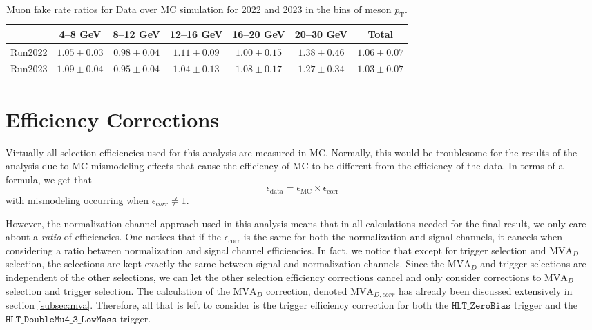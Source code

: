 \begin{table}[htbp]
    \centering
    \begin{tabular}{|c|c|c|c|c|c|c|}
    \hline
     & \textbf{4--8 GeV} & \textbf{8--12 GeV} & \textbf{12--16 GeV} & \textbf{16--20 GeV} & \textbf{20--30 GeV} & \textbf{Total} \\
    \hline
    Run2022 & $1.05 \pm 0.03$ & $0.98 \pm 0.04$ & $1.11 \pm 0.09$ & $1.00 \pm 0.15$ & $1.38 \pm 0.46$ & $1.06 \pm 0.07$ \\
    Run2023 & $1.09 \pm 0.04$ & $0.95 \pm 0.04$ & $1.04 \pm 0.13$ & $1.08 \pm 0.17$ & $1.27 \pm 0.34$ & $1.03 \pm 0.07$ \\
    \hline
    \end{tabular}
    \caption{Muon fake rate ratios for Data over MC simulation for 2022 and 2023 in the bins of meson $p_\mathrm{T}$.}
    \label{tab:muon_fake_rate}
\end{table}


\section{Efficiency Corrections}
\label{sec:efficiency_corrections}


Virtually all selection efficiencies used for this analysis are measured in MC. Normally, this would be troublesome for the results of the analysis due to MC mismodeling effects that cause the efficiency of MC to be different from the efficiency of the data. In terms of a formula, we get that 
\begin{equation}
    \epsilon_{\text{data}} = \epsilon_{\text{MC}} \times \epsilon_{\text{corr}}
\end{equation}
with mismodeling occurring when $\epsilon_{corr} \neq 1$. 

However, the normalization channel approach used in this analysis means that in all calculations needed for the final result, we only care about a \textit{ratio} of efficiencies. One notices that if the $\epsilon_{\text{corr}}$ is the same for both the normalization and signal channels, it cancels when considering a ratio between normalization and signal channel efficiencies. In fact, we notice that except for trigger selection and $\text{MVA}_D$ selection, the selections are kept exactly the same between signal and normalization channels. Since the $\text{MVA}_D$ and trigger selections are independent of the other selections, we can let the other selection efficiency corrections cancel and only consider corrections to $\text{MVA}_D$ selection and trigger selection. The calculation of the $\text{MVA}_D$ correction, denoted $\text{MVA}_{D,corr}$ has already been discussed extensively in section \ref{subsec:mva}. Therefore, all that is left to consider is the trigger efficiency correction for both the $\texttt{HLT\_ZeroBias}$ trigger and the $\texttt{HLT\_DoubleMu4\_3\_LowMass}$ trigger. 

